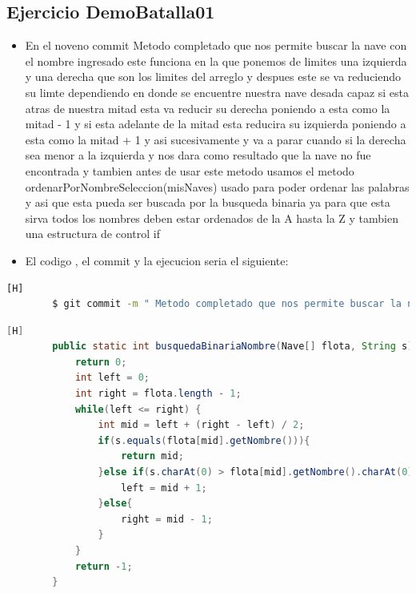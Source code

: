 \documentclass{article}
\begin{document}
	\subsection{Ejercicio DemoBatalla01}
	\begin{itemize}	
		\item En el noveno commit  Metodo completado que nos permite buscar la nave con el nombre ingresado este funciona en la que ponemos de limites una izquierda y una derecha que son los limites del arreglo y despues este se va reduciendo su limte dependiendo en donde se encuentre nuestra nave desada capaz si esta atras de nuestra mitad esta va reducir su derecha poniendo a esta como la mitad - 1 y si esta adelante de la mitad esta reducira su izquierda poniendo a esta como la mitad + 1 y asi sucesivamente y va a parar cuando si la derecha sea menor a la izquierda y nos dara como resultado que la nave no fue encontrada y tambien antes de usar este metodo usamos el metodo ordenarPorNombreSeleccion(misNaves) usado para poder ordenar las palabras y asi que esta pueda ser buscada por la busqueda binaria ya para que esta sirva todos los nombres deben estar ordenados de la A hasta la Z y tambien una estructura de control if
		\item El codigo , el commit y la ejecucion seria el siguiente:
	\end{itemize}
	\begin{lstlisting}[language=bash,caption={Commit}][H]
		$ git commit -m " Metodo completado que nos permite buscar la nave con el nombre ingresado este funciona en la que ponemos de limites una izquierda y una derecha que son los limites del arreglo y despues este se va reduciendo su limte dependiendo en donde se encuentre nuestra nave desada capaz si esta atras de nuestra mitad esta va reducir su derecha poniendo a esta como la mitad - 1 y si esta adelante de la mitad esta reducira su izquierda poniendo a esta como la mitad + 1 y asi sucesivamente y va a parar cuando si la derecha sea menor a la izquierda y nos dara como resultado que la nave no fue encontrada y tambien antes de usar este metodo usamos el metodo ordenarPorNombreSeleccion(misNaves) usado para poder ordenar las palabras y asi que esta pueda ser buscada por la busqueda binaria ya para que esta sirva todos los nombres deben estar ordenados de la A hasta la Z y tambien una estructura de control if"
	\end{lstlisting}
	\begin{lstlisting}[language=java,caption={Las lineas de codigo de lo creado:}][H]
		public static int busquedaBinariaNombre(Nave[] flota, String s){
			return 0;
			int left = 0;
			int right = flota.length - 1;
			while(left <= right) {
				int mid = left + (right - left) / 2;
				if(s.equals(flota[mid].getNombre())){
					return mid;
				}else if(s.charAt(0) > flota[mid].getNombre().charAt(0)){
					left = mid + 1;
				}else{
					right = mid - 1;
				}
			}
			return -1;
		}
	\end{lstlisting}
\end{document}
